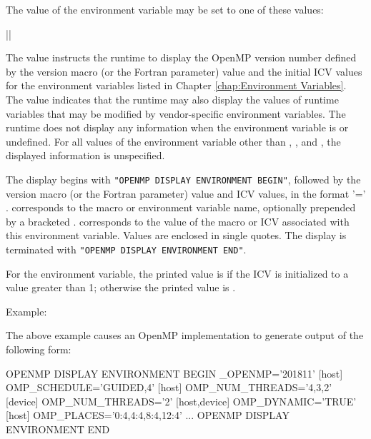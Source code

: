 The value of the  environment variable may be set 
to one of these values:

{||}

The  value instructs the runtime to display the OpenMP version 
number defined by the  version macro (or the  
Fortran parameter) value and the initial ICV values for the environment variables 
listed in Chapter \ref{chap:Environment Variables}. The 
value indicates that the runtime may also display the values
of runtime variables that may be modified by vendor-specific
environment variables. The runtime does not display any information
when the  environment variable is
 or undefined. For all values of the environment
variable other than , , and ,
the displayed information is unspecified.

The display begins with \texttt{"OPENMP DISPLAY ENVIRONMENT BEGIN"}, 
followed by the  version macro (or the  
Fortran parameter) value and ICV values, in the format  '=' 
.  corresponds to the macro or environment variable 
name, optionally prepended by a bracketed . 
corresponds to the value of the macro or ICV associated with this environment 
variable. Values are enclosed in single quotes. The display is 
terminated with \texttt{"OPENMP DISPLAY ENVIRONMENT END"}.

For the  environment variable, the printed value is
 if the  ICV is initialized to a
value greater than 1; otherwise the printed value is .

Example:
\begin{ompEnv}
\end{ompEnv}

The above example causes an OpenMP implementation to generate output of the
following form:

\begin{ompEnv}
OPENMP DISPLAY ENVIRONMENT BEGIN
  _OPENMP='201811'
  [host] OMP_SCHEDULE='GUIDED,4'
  [host] OMP_NUM_THREADS='4,3,2'
  [device] OMP_NUM_THREADS='2'
  [host,device] OMP_DYNAMIC='TRUE'
  [host] OMP_PLACES='{0:4},{4:4},{8:4},{12:4}'
  ...
OPENMP DISPLAY ENVIRONMENT END
\end{ompEnv}


